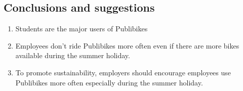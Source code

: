 \documentclass{article}
\begin{document}
\subsection{Conclusions and suggestions}
\begin{enumerate}
    \item Students are the major users of Publibikes
    \item Employees don't ride Publibikes more often even if there are more bikes available during the summer holiday.
    \item To promote sustainability, employers should encourage employees use Publibikes more often especially during the summer holiday.
\end{enumerate}
\end{document}
